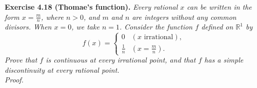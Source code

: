 \documentclass{article}
\begin{document}
\textbf{Exercise 4.18 (Thomae's function).}
\emph{Every rational $x$ can be written in the form $x = \frac{m}{n}$, where $n > 0$,
and $m$ and $n$ are integers without any common divisors.
When $x = 0$, we take $n = 1$.
Consider the function $f$ defined on $\mathbb{R}^1$ by
\begin{equation*}
  f(x) =
    \begin{cases}
      0           & (\text{$x$ irrational}), \\
      \frac{1}{n} & (x = \frac{m}{n}).
    \end{cases}
\end{equation*}
Prove that $f$ is continuous at every irrational point,
and that $f$ has a simple discontinuity at every rational point.} \\

\emph{Proof.}
\end{document}
